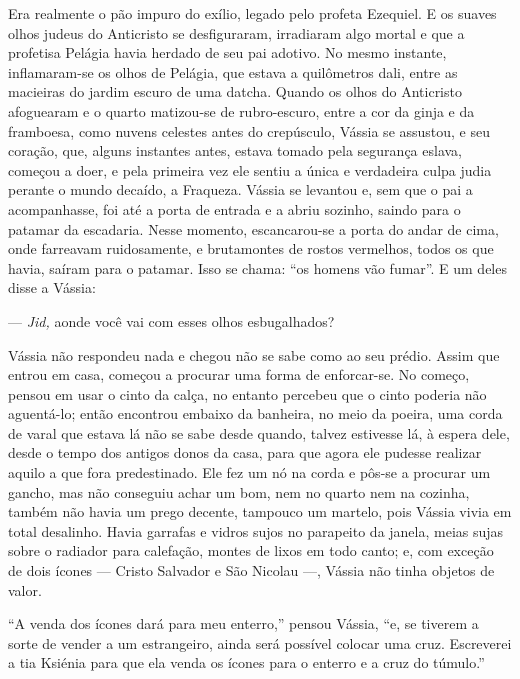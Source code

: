 Era realmente o pão impuro do exílio, legado pelo profeta Ezequiel. E os
suaves olhos judeus do Anticristo se desfiguraram, irradiaram algo
mortal e que a profetisa Pelágia havia herdado de seu pai adotivo. No
mesmo instante, inflamaram-se os olhos de Pelágia, que estava a
quilômetros dali, entre as macieiras do jardim escuro de uma datcha.
Quando os olhos do Anticristo afoguearam e o quarto matizou-se de
rubro-escuro, entre a cor da ginja e da framboesa, como nuvens celestes
antes do crepúsculo, Vássia se assustou, e seu coração, que, alguns
instantes antes, estava tomado pela segurança eslava, começou a doer, e
pela primeira vez ele sentiu a única e verdadeira culpa judia perante o
mundo decaído, a Fraqueza. Vássia se levantou e, sem que o pai a
acompanhasse, foi até a porta de entrada e a abriu sozinho, saindo para
o patamar da escadaria. Nesse momento, escancarou-se a porta do andar de
cima, onde farreavam ruidosamente, e brutamontes de rostos vermelhos,
todos os que havia, saíram para o patamar. Isso se chama: ``os homens
vão fumar''. E um deles disse a Vássia:

--- \emph{Jid,} aonde você vai com esses olhos esbugalhados?

Vássia não respondeu nada e chegou não se sabe como ao seu prédio. Assim
que entrou em casa, começou a procurar uma forma de enforcar-se. No
começo, pensou em usar o cinto da calça, no entanto percebeu que o cinto
poderia não aguentá-lo; então encontrou embaixo da banheira, no meio da
poeira, uma corda de varal que estava lá não se sabe desde quando,
talvez estivesse lá, à espera dele, desde o tempo dos antigos donos da
casa, para que agora ele pudesse realizar aquilo a que fora
predestinado. Ele fez um nó na corda e pôs-se a procurar um gancho, mas
não conseguiu achar um bom, nem no quarto nem na cozinha, também não
havia um prego decente, tampouco um martelo, pois Vássia vivia em total
desalinho. Havia garrafas e vidros sujos no parapeito da janela, meias
sujas sobre o radiador para calefação, montes de lixos em todo canto; e,
com exceção de dois ícones --- Cristo Salvador e São Nicolau ---, Vássia
não tinha objetos de valor.

``A venda dos ícones dará para meu enterro,'' pensou Vássia, ``e, se
tiverem a sorte de vender a um estrangeiro, ainda será possível colocar
uma cruz. Escreverei a tia Ksiénia para que ela venda os ícones para o
enterro e a cruz do túmulo.''

